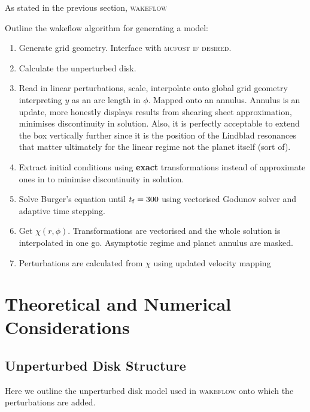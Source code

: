 As stated in the previous section, \textsc{wakeflow}

Outline the wakeflow algorithm for generating a model:
\begin{enumerate}
    \item Generate grid geometry. Interface with \textsc{mcfost if desired}.
    \item Calculate the unperturbed disk.
    \item Read in linear perturbations, scale, interpolate onto global grid geometry interpreting $y$ as an arc length in $\phi$. Mapped onto an annulus. Annulus is an update, more honestly displays results from shearing sheet approximation, minimises discontinuity in solution. Also, it is perfectly acceptable to extend the box vertically further since it is the position of the Lindblad resonances that matter ultimately for the linear regime not the planet itself (sort of).
    \item Extract initial conditions using \textbf{exact} transformations instead of approximate ones in \citet{bollati2021} to minimise discontinuity in solution.
    \item Solve Burger's equation until $t_{\rm f}=300$ using vectorised Godunov solver and adaptive time stepping.
    \item Get $\chi(r,\phi)$. Transformations are vectorised and the whole solution is interpolated in one go. Asymptotic regime and planet annulus are masked.
    \item Perturbations are calculated from $\chi$ using updated velocity mapping
\end{enumerate}

\section{Theoretical and Numerical Considerations} 


\subsection{Unperturbed Disk Structure} \label{sec:diskstruct}

Here we outline the unperturbed disk model used in \textsc{wakeflow} onto which the perturbations are added.

